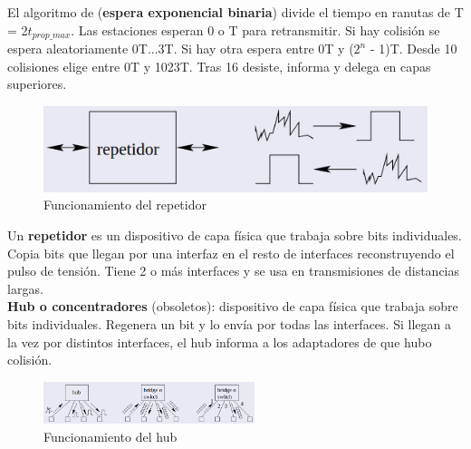 \documentclass{article}
\begin{document}
El algoritmo de (\textbf{espera exponencial binaria}) divide el tiempo en ranutas de T = 2$t_{prop\_max}$. Las estaciones esperan 0 o T para retransmitir. Si hay colisión se espera aleatoriamente 0T...3T. Si hay otra espera entre 0T y ($2^n$ - 1)T. Desde 10 colisiones elige entre 0T y 1023T. Tras 16 desiste, informa y delega en capas superiores. \\

\newpage

\begin{figure}
    \centering
    \includegraphics[width=\linewidth]{img-t5/img_050_02.png}
    \caption{Funcionamiento del repetidor}
\end{figure}

Un \textbf{repetidor} es un dispositivo de capa física que trabaja sobre bits individuales. Copia bits que llegan por una interfaz en el resto de interfaces reconstruyendo el pulso de tensión. Tiene 2 o más interfaces y se usa en transmisiones de distancias largas. \\

\textbf{Hub o concentradores} (obsoletos): dispositivo de capa física que trabaja sobre bits individuales. Regenera un bit y lo envía por todas las interfaces. Si llegan a la vez por distintos interfaces, el hub informa a los adaptadores de que hubo colisión.

\begin{figure}[h]
    \centering
    \includegraphics[width=0.55\textwidth]{img-t5/img_117_05.png}
    \caption{Funcionamiento del hub}
\end{figure}
\end{document}
